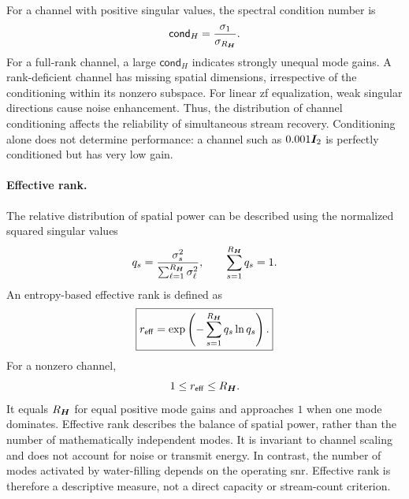 For a channel with positive singular values,
the spectral condition number is
\begin{equation}\label{eq:condition}
	\mathsf{cond}_{H}
	=\frac{\sigma_1}{\sigma_{R_{\bm{H}}}}.
\end{equation}
For a full-rank channel, a large
$\mathsf{cond}_{H}$ indicates strongly unequal
mode gains. A rank-deficient channel has
missing spatial dimensions, irrespective of
the conditioning within its nonzero subspace.
%
For linear \ac{zf} equalization, weak singular
directions cause noise enhancement.
Thus, the distribution of channel conditioning
affects the reliability of simultaneous
stream recovery.
%
Conditioning alone does not determine performance:
a channel such as $0.001\bm{I}_2$ is perfectly
conditioned but has very low gain.

\paragraph{Effective rank.}
The relative distribution of spatial power
can be described using the normalized
squared singular values
\begin{equation*}
	q_s
	=\frac{\sigma_s^2}
	{\sum_{\ell=1}^{R_{\bm{H}}}\sigma_\ell^2},
	\qquad
	\sum_{s=1}^{R_{\bm{H}}}q_s=1.
\end{equation*}
An entropy-based effective rank is defined as
\begin{equation}\label{eq:effectiverank}
	\boxed{
		r_{\mathsf{eff}}
		=\exp\left(
		-\sum_{s=1}^{R_{\bm{H}}}q_s\ln q_s
		\right).
	}
\end{equation}
For a nonzero channel,
\begin{equation*}
	1\leq r_{\mathsf{eff}}\leq R_{\bm{H}}.
\end{equation*}
It equals $R_{\bm{H}}$ for equal positive mode gains
and approaches $1$ when one mode dominates.
%
Effective rank describes the balance of spatial
power, rather than the number of mathematically
independent modes. It is invariant to channel
scaling and does not account for noise or
transmit energy.
%
In contrast, the number of modes activated by
water-filling depends on the operating \ac{snr}.
Effective rank is therefore a descriptive
measure, not a direct capacity or stream-count
criterion.

